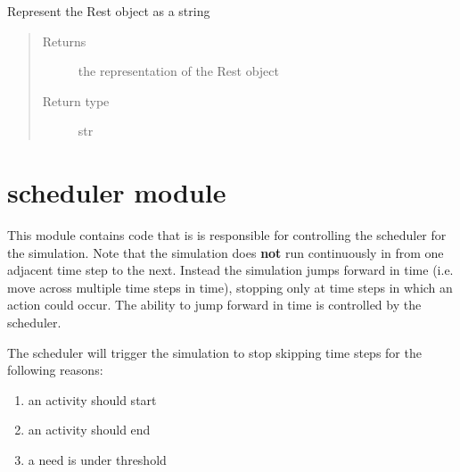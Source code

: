 \documentclass[letterpaper,10pt,english]{sphinxmanual}
\begin{document}
\begin{fulllineitems}
\begin{fulllineitems}
\begin{quote}
\begin{description}
\end{description}\end{quote}

\end{fulllineitems}


\begin{fulllineitems}
\label{rest:rest.Rest.toString}
Represent the Rest object as a string
\begin{quote}\begin{description}
\item[{Returns}] \leavevmode
the representation of the Rest object

\item[{Return type}] \leavevmode
str

\end{description}\end{quote}

\end{fulllineitems}


\end{fulllineitems}



\section{scheduler module}
\label{scheduler::doc}\label{scheduler:module-scheduler}\label{scheduler:scheduler-module}
This module contains code that is is responsible for controlling the scheduler for the simulation. Note that the simulation does \textbf{not} run continuously in from one adjacent time step to the next. Instead the simulation jumps forward in time (i.e. move across multiple time steps in time), stopping only at time steps in which an action could occur. The ability to jump forward in time is controlled by the scheduler.

The scheduler will trigger the simulation to stop skipping time steps for the following reasons:
\begin{enumerate}
\item {} 
an activity should start

\item {} 
an activity should end

\item {} 
a need is under threshold

\end{enumerate}
\end{document}
